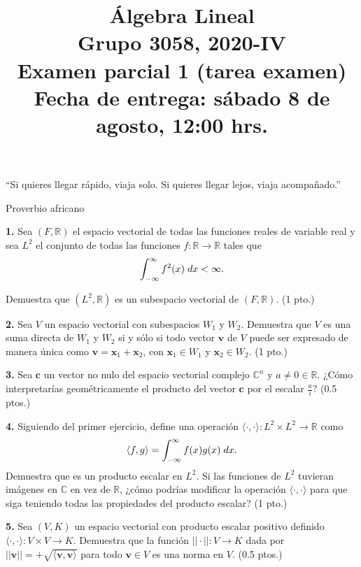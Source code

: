 \documentclass[a4paper]{article}
\begin{document}
\title{Álgebra Lineal \\ Grupo 3058, 2020-IV \\ Examen parcial 1 (tarea examen) \\ Fecha de entrega: sábado 8 de agosto, 12:00 hrs.}
\date{}
\maketitle

\epigraph{``Si quieres llegar rápido, viaja solo. Si quieres llegar lejos, viaja acompañado.''}{\textemdash Proverbio africano}

\vspace{1cm}
\textbf{1.} Sea $(F,\mathbb{R})$ el espacio vectorial de todas las funciones reales de variable real y sea $L^2$ el conjunto de todas las funciones $f:\mathbb{R}\to\mathbb{R}$ tales que $$\int_{-\infty}^{\infty} f^2(x) \hspace{1mm} dx < \infty.$$

\noindent Demuestra que $(L^2,\mathbb{R})$ es un subespacio vectorial de $(F,\mathbb{R})$. (1 pto.)

\vspace{1cm}
\textbf{2.} Sea $V$ un espacio vectorial con subespacios $W_1$ y $W_2$. Demuestra que $V$ es una suma directa de $W_1$ y $W_2$ si y sólo si todo vector $\mathbf{v}$ de $V$ puede ser expresado de manera única como $\mathbf{v}=\mathbf{x}_1+\mathbf{x}_2$, con $\mathbf{x}_1\in W_1$ y $\mathbf{x}_2\in W_2.$ (1 pto.)

\vspace{1cm}
\textbf{3.} Sea $\mathbf{c}$ un vector no nulo del espacio vectorial complejo $\mathbb{C}^n$ y $a\neq 0\in\mathbb{R}$. ¿Cómo interpretarías geométricamente el producto del vector $\mathbf{c}$ por el escalar $\frac{a}{i}?$ (0.5 ptos.)

\vspace{1cm}
\textbf{4.} Siguiendo del primer ejercicio, define una operación $\langle\cdot, \cdot\rangle:L^2\times L^2\to\mathbb{R}$ como $$\langle f,g\rangle = \int_{-\infty}^{\infty} f(x)g(x) \hspace{1mm} dx. $$ Demuestra que es un producto escalar en $L^2$. Si las funciones de $L^2$ tuvieran imágenes en $\mathbb{C}$ en vez de $\mathbb{R}$, ¿cómo podrías modificar la operación $\langle\cdot, \cdot\rangle$ para que siga teniendo todas las propiedades del producto escalar? (1 pto.)

\vspace{1cm}
\textbf{5.} Sea $(V,K)$ un espacio vectorial con producto escalar positivo definido $\langle\cdot,\cdot\rangle:V\times V\to K$. Demuestra que la función $||\cdot||:V\to K$ dada por $||\mathbf{v}||=+\sqrt{\langle\mathbf{v},\mathbf{v}\rangle}$ para todo $\mathbf{v}\in V$ es una norma en $V$. (0.5 ptos.)
\end{document}
